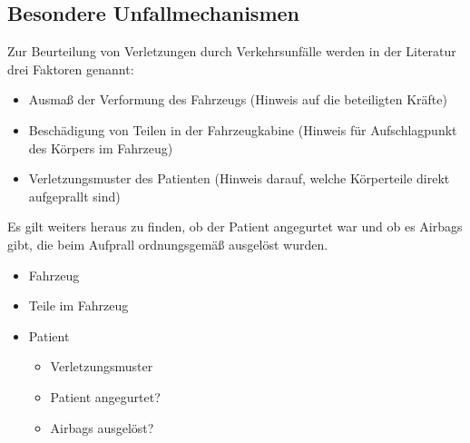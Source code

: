 \subsection{Besondere Unfallmechanismen}


{ Zur Beurteilung von Verletzungen durch Verkehrsunfälle
werden in der Literatur drei Faktoren genannt:
\begin{itemize}
  \item Ausmaß der Verformung des Fahrzeugs (Hinweis auf die
  beteiligten Kräfte)
  \item Beschädigung von Teilen in der
  Fahrzeugkabine (Hinweis für Aufschlagpunkt des Körpers im
  Fahrzeug) 
  \item Verletzungsmuster des
  Patienten (Hinweis darauf,
  welche Körperteile direkt aufgeprallt sind)
\end{itemize}
Es gilt weiters heraus zu finden, ob der Patient angegurtet
war und ob es Airbags gibt, die beim Aufprall ordnungsgemäß
ausgelöst wurden. 
\cite{ITLSde6,RedelsteinerHRNS1}
}{
\begin{itemize}
  \item Fahrzeug
  \item Teile im Fahrzeug
  \item Patient
  \begin{itemize}
    \item Verletzungsmuster
    \item Patient angegurtet?
    \item Airbags ausgelöst?
  \end{itemize}
\end{itemize}
}{}{}{}



